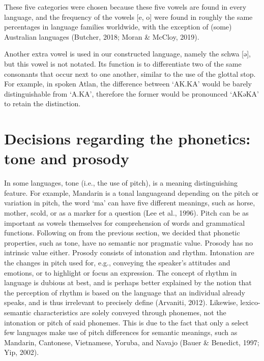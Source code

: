 These five categories were chosen because these five vowels are found in every language, and the frequency of the vowels [e, o] were found in roughly the same percentages in language families worldwide, with the exception of (some) Australian languages (Butcher, 2018; Moran \& McCloy, 2019). 

Another extra vowel is used in our constructed language, namely the schwa [ə], but this vowel is not notated. Its function is to differentiate two of the same consonants that occur next to one another, similar to the use of the glottal stop. For example, in spoken Atlan, the difference between ‘AK.KA’ would be barely distinguishable from ‘A.KA’, therefore the former would be pronounced ‘AKəKA’ to retain the distinction. 

\section{Decisions regarding the phonetics: tone and prosody}

\noindent In some languages, tone (i.e., the use of pitch), is a meaning distinguishing feature. For example, Mandarin is a tonal languageand depending on the pitch or variation in pitch, the word ‘ma’ can have five different meanings, such as horse, mother, scold, or as a marker for a question (Lee et al., 1996). Pitch can be as important as vowels themselves for comprehension of words and grammatical functions. Following on from the previous section, we decided that phonetic properties, such as tone, have no semantic nor pragmatic value. Prosody has no intrinsic value either. Prosody consists of intonation and rhythm. Intonation are the changes in pitch used for, e.g., conveying the speaker's attitudes and emotions, or to highlight or focus an expression. The concept of rhythm in language is dubious at best, and is perhaps better explained by the notion that the perception of rhythm is based on the language that an individual already speaks, and is thus irrelevant to precisely define (Arvaniti, 2012). Likewise, lexico-semantic characteristics are solely conveyed through phonemes, not the intonation or pitch of said phonemes. This is due to the fact that only a select few languages make use of pitch differences for semantic meanings, such as Mandarin, Cantonese, Vietnamese, Yoruba, and Navajo (Bauer \& Benedict, 1997; Yip, 2002). 
  
